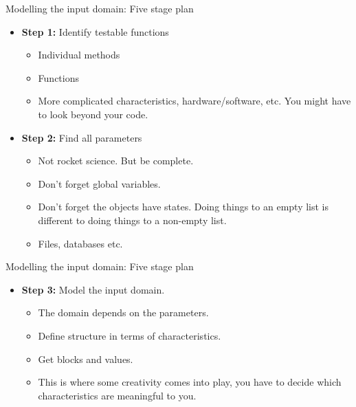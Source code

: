 \documentclass{beamer}
\begin{document}
\begin{frame}{Modelling the input domain: Five stage plan}

  \begin{itemize}
  \item {\bf Step 1:} Identify testable functions
    \begin{itemize}
    \item Individual methods
    \item Functions
    \item More complicated characteristics, hardware/software,
      etc. You might have to look beyond your code.
    \end{itemize}
  \item {\bf Step 2:} Find all parameters
    \begin{itemize}
    \item Not rocket science. But be complete.
    \item Don't forget global variables.
    \item Don't forget the objects have states. Doing things to an
      empty list is different to doing things to a non-empty list.
    \item Files, databases etc.
    \end{itemize}
  \end{itemize}
  \end{frame}
\begin{frame}{Modelling the input domain: Five stage plan}
  \begin{itemize}
  \item {\bf Step 3:} Model the input domain.
    \begin{itemize}
    \item The domain depends on the parameters.
    \item Define structure in terms of characteristics.
    \item Get blocks and values.
    \item This is where some creativity comes into play, you have to
      decide which characteristics are meaningful to you. 
    \end{itemize}
  \end{itemize}
\end{frame}
\end{document}

